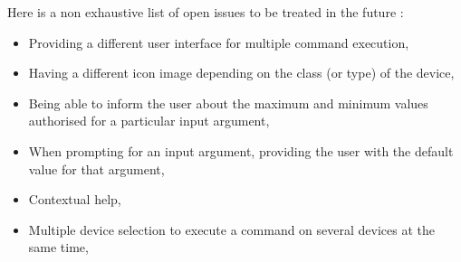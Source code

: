 %
%
%
%
%
%
%
%
%
%
Here is a non exhaustive list of open issues to be treated in the future :
\begin{itemize}
\item
Providing a different user interface for multiple command execution,
\item
Having a different icon image depending on the class (or type) of the device,
\item
Being  able to inform the user about the maximum and minimum values authorised
for a particular input argument,
\item
When prompting for an input argument, providing the user with the default value
for that argument,
\item
Contextual help,
\item
Multiple device selection to execute a command on several devices at the same
time,
\end{itemize}

